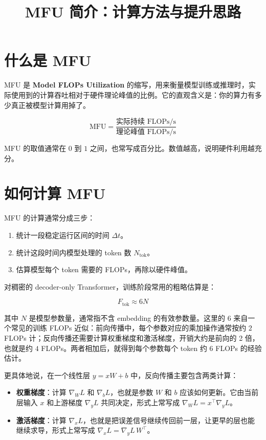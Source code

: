 \documentclass[UTF8,a4paper,11pt]{ctexart}
\title{MFU 简介：计算方法与提升思路}
\author{}
\date{}
\begin{document}
\maketitle

\section{什么是 MFU}
MFU 是 \textbf{Model FLOPs Utilization} 的缩写，用来衡量模型训练或推理时，实际使用到的计算吞吐相对于硬件理论峰值的比例。它的直观含义是：你的算力有多少真正被模型计算用掉了。

\begin{equation}
\mathrm{MFU} = \frac{\text{实际持续 FLOPs/s}}{\text{理论峰值 FLOPs/s}}
\end{equation}

MFU 的取值通常在 $0$ 到 $1$ 之间，也常写成百分比。数值越高，说明硬件利用越充分。

\section{如何计算 MFU}
MFU 的计算通常分成三步：

\begin{enumerate}
  \item 统计一段稳定运行区间的时间 $\Delta t$。
  \item 统计这段时间内模型处理的 token 数 $N_{\text{tok}}$。
  \item 估算模型每个 token 需要的 FLOPs，再除以硬件峰值。
\end{enumerate}

对稠密的 decoder-only Transformer，训练阶段常用的粗略估算是：

\begin{equation}
F_{\text{tok}} \approx 6N
\end{equation}

其中 $N$ 是模型参数量，通常指不含 embedding 的有效参数量。这里的 $6$ 来自一个常见的训练 FLOPs 近似：前向传播中，每个参数对应的乘加操作通常按约 $2$ FLOPs 计；反向传播还需要计算权重梯度和激活梯度，开销大约是前向的 2 倍，也就是约 $4$ FLOPs。两者相加后，就得到每个参数每个 token 约 $6$ FLOPs 的经验估计。

更具体地说，在一个线性层 $y = xW + b$ 中，反向传播主要包含两类计算：
\begin{itemize}
  \item \textbf{权重梯度}：计算 $\nabla_W L$ 和 $\nabla_b L$，也就是参数 $W$ 和 $b$ 应该如何更新。它由当前层输入 $x$ 和上游梯度 $\nabla_y L$ 共同决定，形式上常写成 $\nabla_W L = x^\top \nabla_y L$。
  \item \textbf{激活梯度}：计算 $\nabla_x L$，也就是把误差信号继续传回前一层，让更早的层也能继续求导，形式上常写成 $\nabla_x L = \nabla_y L \, W^\top$。
\end{itemize}
\end{document}
